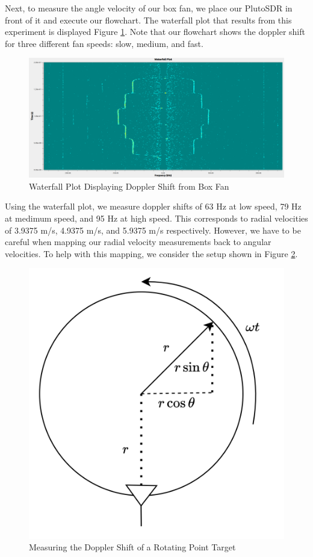 \documentclass{article}
\begin{document}


Next, to measure the angle velocity of our box fan, we place our PlutoSDR in front of it and execute our flowchart. The waterfall plot that results from this experiment is displayed Figure \ref{fig::dopp_spectrum}. Note that our flowchart shows the doppler shift for three different fan speeds: slow, medium, and fast.

\begin{figure}[H]
    	\centering
    \includegraphics[width=0.9\linewidth]{dopp_spectrum2.png}
    	\caption{Waterfall Plot Displaying Doppler Shift from Box Fan}
    	\label{fig::dopp_spectrum}
\end{figure}

\noindent Using the waterfall plot, we measure doppler shifts of 63 Hz at low speed, 79 Hz at medimum speed, and 95 Hz at high speed. This corresponds to radial velocities of 3.9375 m/s, 4.9375 m/s, and 5.9375 m/s respectively. However, we have to be careful when mapping our radial velocity measurements back to angular velocities. To help with this mapping, we consider the setup shown in Figure \ref{fig::angular_velocity_measurement}. 
\begin{figure}[H]
    	\centering
    \includegraphics[width=0.4\linewidth]{angular_velocity_measurement.png}
    	\caption{Measuring the Doppler Shift of a Rotating Point Target}
    	\label{fig::angular_velocity_measurement}
\end{figure}
\end{document}
